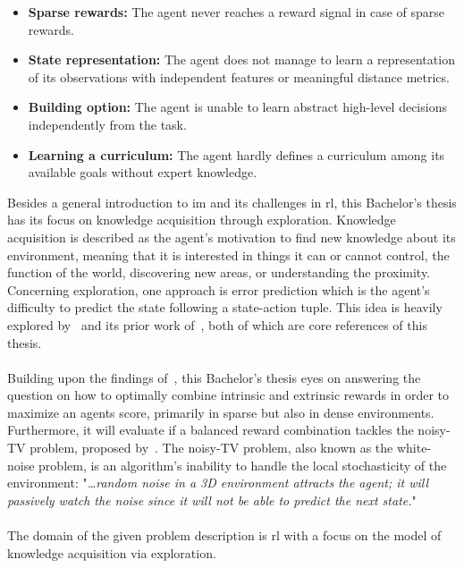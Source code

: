 \documentclass[draft,final]{vutinfth} %
\newcommand{\p}[1]{see p. #1}
\begin{document}
    \begin{itemize}
        \item \textbf{Sparse rewards:} The agent never reaches a reward signal in case of sparse rewards.
        \item \textbf{State representation:} The agent does not manage to learn a representation of its observations with independent features or meaningful distance metrics.
        \item \textbf{Building option:} The agent is unable to learn abstract high-level decisions independently from the task.
        \item \textbf{Learning a curriculum:} The agent hardly defines a curriculum among its available goals without expert knowledge.
        \label{enm:challenges}
    \end{itemize}

    Besides a general introduction to \gls{im} and its challenges in \gls{rl}, this Bachelor's thesis has its focus on knowledge acquisition through exploration.
    Knowledge acquisition is described as the agent's motivation to find new knowledge about its environment, meaning that it is interested in things it can or cannot control, the function of the world, discovering new areas, or understanding the proximity.
    Concerning exploration, one approach is error prediction which is the agent's difficulty to predict the state following a state-action tuple.
    This idea is heavily explored by~\cite{burda_large-scale_2018-1} and its prior work of~\cite{pathak_curiosity-driven_2017-1}, both of which are core references of this thesis.
    \\\\
    Building upon the findings of~\citeauthor{burda_large-scale_2018-1}, this Bachelor's thesis eyes on answering the question on how to optimally combine intrinsic and extrinsic rewards in order to maximize an agents score, primarily in sparse but also in dense environments.
    Furthermore, it will evaluate if a balanced reward combination tackles the noisy-TV problem, proposed by~\cite{schmidhuber_formal_2010}.
    The noisy-TV problem, also known as the white-noise problem, is an algorithm's inability to handle the local stochasticity of the environment: "\textit{\ldots random noise in a 3D environment attracts the agent; it will passively watch the noise since it will not be able to predict the next state.}"\cite[\p{10}]{aubret_survey_2019}
    \\\\
    The domain of the given problem description is \gls{rl} with a focus on the model of knowledge acquisition via exploration.
\end{document}
